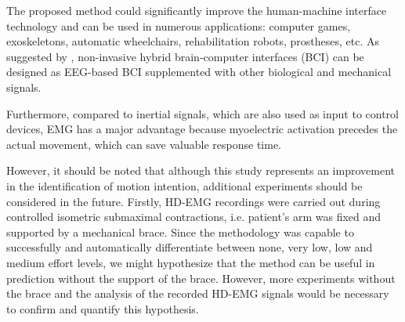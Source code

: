 The proposed method could significantly improve the human-machine interface technology and can be used in numerous applications: computer games, exoskeletons, automatic wheelchairs, rehabilitation robots, prostheses, etc. As suggested by \citet{Muller-Putz2015}, non-invasive hybrid brain-computer interfaces (BCI) can be designed as EEG-based BCI supplemented with other biological and mechanical signals. %


Furthermore, compared to inertial signals, which are also used as input to control devices, EMG has a major advantage because myoelectric activation precedes the actual movement, which can save valuable response time.

However, it should be noted that although this study represents an improvement in the identification of motion intention, additional experiments should be considered in the future. Firstly, HD-EMG recordings were carried out during controlled isometric submaximal contractions, i.e. patient’s arm was fixed and supported by a mechanical brace. Since the methodology was capable to successfully and automatically differentiate between none, very low, low and medium effort levels, we might hypothesize that the method can be useful in prediction without the support of the brace. However, more experiments without the brace and the analysis of the recorded HD-EMG signals would be necessary to confirm and quantify this hypothesis.




